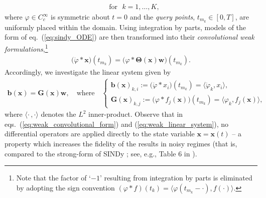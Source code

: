 \documentclass[journal=gmj]{CUP-JNL-DTM}%
\theoremstyle{definition}
\numberwithin{equation}{section}
\begin{document}
\begin{align*}
    \quad \text{for} \ \ \ k = 1, \dots, K,
\end{align*} where $\varphi \in C^{\infty}_c$ is symmetric about $t=0$ and the \textit{query points}, $t_{m_k} \in [0,T]$, are uniformly placed within the domain. Using integration by parts, models of the form of eq.~(\ref{eq:sindy_ODE}) are then transformed into their \textit{convolutional weak formulations},\footnote{Note that the factor of `$-1$' resulting from integration by parts is eliminated by adopting the sign convention $(\varphi * f)(t_k) = \langle \varphi(t_{m_k} - \cdot), f(\cdot)\rangle$.} \begin{align}\label{eq:weak_convolutional_form}
    \big(\dot{\varphi} * \boldsymbol{x}\big)(t_{m_k}) = \big(\varphi * \mathbf{\Theta}(\boldsymbol{x}) \mathbf{w}\big)(t_{m_k}).
\end{align} Accordingly, we investigate the linear system given by \begin{align}\label{eq:weak_linear_system}
    \mathbf{b}(\boldsymbol{x}) = \mathbf{G}(\boldsymbol{x}) \mathbf{w},
    \quad \text{where} \quad
    \begin{cases}
        \mathbf{b}(\boldsymbol{x})_{k,i} := \big(\dot{\varphi} * x_i\big)(t_{m_k}) = \langle \dot{\varphi}_k, x_i \rangle,
        \\
        \mathbf{G}(\boldsymbol{x})_{k,j} := \big(\varphi * f_j(\boldsymbol{x})\big)(t_{m_k}) = \langle \varphi_k, f_j(\boldsymbol{x}) \rangle,
    \end{cases}
\end{align} where $\langle\cdot\,,\cdot\rangle$ denotes the $L^2$ inner-product. Observe that in eqs.~(\ref{eq:weak_convolutional_form}) and (\ref{eq:weak_linear_system}), no differential operators are applied directly to the state variable $\boldsymbol{x} = \boldsymbol{x}(t)$ -- a property which increases the fidelity of the results in noisy regimes (that is, compared to the strong-form of SINDy \cite{Brunton.etal2016ProcNatlAcadSciUSA}; see, e.g., Table 6 in \cite{Messenger.Bortz2021JournalofComputationalPhysics}).

\smallskip
\end{document}
